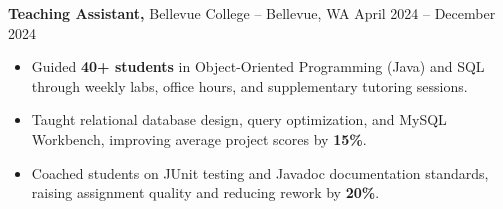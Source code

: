 \documentclass[11pt]{article}       %
\begin{document}
\textbf{Teaching Assistant,} {Bellevue College} -- Bellevue, WA \hfill April 2024 -- December 2024 \\
\vspace{-9pt}
\begin{itemize}
  \item Guided \textbf{40+ students} in Object-Oriented Programming (Java) and SQL through weekly labs, office hours, and supplementary tutoring sessions.
  \item Taught relational database design, query optimization, and MySQL Workbench, improving average project scores by \textbf{15\%}.
  \item Coached students on JUnit testing and Javadoc documentation standards, raising assignment quality and reducing rework by \textbf{20\%}.
\end{itemize}

\end{document}

